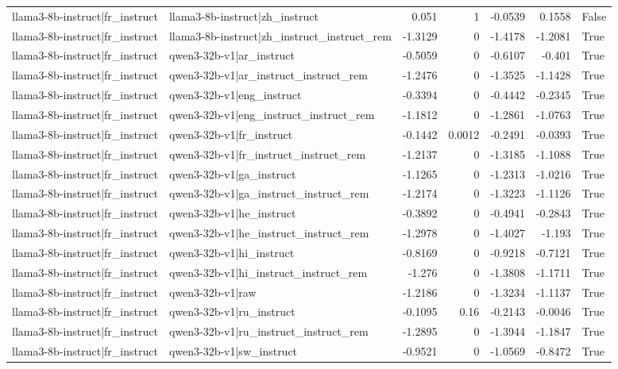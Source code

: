 \begin{table}
\begin{tabular}{l l r r r r l}
llama3-8b-instruct|fr_instruct & llama3-8b-instruct|zh_instruct & 0.051 & 1 & -0.0539 & 0.1558 & False \\
llama3-8b-instruct|fr_instruct & llama3-8b-instruct|zh_instruct_instruct_rem & -1.3129 & 0 & -1.4178 & -1.2081 & True \\
llama3-8b-instruct|fr_instruct & qwen3-32b-v1|ar_instruct & -0.5059 & 0 & -0.6107 & -0.401 & True \\
llama3-8b-instruct|fr_instruct & qwen3-32b-v1|ar_instruct_instruct_rem & -1.2476 & 0 & -1.3525 & -1.1428 & True \\
llama3-8b-instruct|fr_instruct & qwen3-32b-v1|eng_instruct & -0.3394 & 0 & -0.4442 & -0.2345 & True \\
llama3-8b-instruct|fr_instruct & qwen3-32b-v1|eng_instruct_instruct_rem & -1.1812 & 0 & -1.2861 & -1.0763 & True \\
llama3-8b-instruct|fr_instruct & qwen3-32b-v1|fr_instruct & -0.1442 & 0.0012 & -0.2491 & -0.0393 & True \\
llama3-8b-instruct|fr_instruct & qwen3-32b-v1|fr_instruct_instruct_rem & -1.2137 & 0 & -1.3185 & -1.1088 & True \\
llama3-8b-instruct|fr_instruct & qwen3-32b-v1|ga_instruct & -1.1265 & 0 & -1.2313 & -1.0216 & True \\
llama3-8b-instruct|fr_instruct & qwen3-32b-v1|ga_instruct_instruct_rem & -1.2174 & 0 & -1.3223 & -1.1126 & True \\
llama3-8b-instruct|fr_instruct & qwen3-32b-v1|he_instruct & -0.3892 & 0 & -0.4941 & -0.2843 & True \\
llama3-8b-instruct|fr_instruct & qwen3-32b-v1|he_instruct_instruct_rem & -1.2978 & 0 & -1.4027 & -1.193 & True \\
llama3-8b-instruct|fr_instruct & qwen3-32b-v1|hi_instruct & -0.8169 & 0 & -0.9218 & -0.7121 & True \\
llama3-8b-instruct|fr_instruct & qwen3-32b-v1|hi_instruct_instruct_rem & -1.276 & 0 & -1.3808 & -1.1711 & True \\
llama3-8b-instruct|fr_instruct & qwen3-32b-v1|raw & -1.2186 & 0 & -1.3234 & -1.1137 & True \\
llama3-8b-instruct|fr_instruct & qwen3-32b-v1|ru_instruct & -0.1095 & 0.16 & -0.2143 & -0.0046 & True \\
llama3-8b-instruct|fr_instruct & qwen3-32b-v1|ru_instruct_instruct_rem & -1.2895 & 0 & -1.3944 & -1.1847 & True \\
llama3-8b-instruct|fr_instruct & qwen3-32b-v1|sw_instruct & -0.9521 & 0 & -1.0569 & -0.8472 & True \\

\end{tabular}
\end{table}
